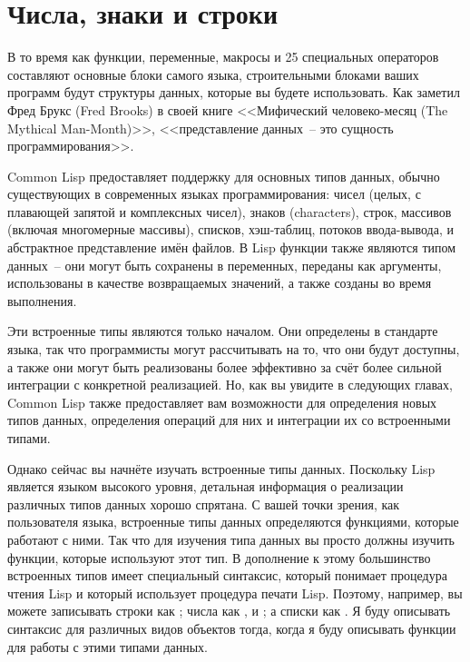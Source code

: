 \chapter{Числа, знаки и строки}
\label{ch:10}

В то время как функции, переменные, макросы и 25 специальных операторов составляют
основные блоки самого языка, строительными блоками ваших программ будут структуры данных,
которые вы будете использовать.  Как заметил Фред Брукс (Fred Brooks) в своей книге
<<Мифический человеко-месяц (The Mythical Man-Month)>>, <<представление данных~-- это
сущность программирования>>.

Common Lisp предоставляет поддержку для основных типов данных, обычно существующих в
современных языках программирования: чисел (целых, с плавающей запятой и комплексных
чисел), знаков (characters), строк, массивов
(включая многомерные массивы), списков, хэш-таблиц, потоков ввода-вывода, и абстрактное
представление имён файлов.  В Lisp функции также являются типом данных~-- они могут быть
сохранены в переменных, переданы как аргументы, использованы в качестве возвращаемых
значений, а также созданы во время выполнения.

Эти встроенные типы являются только началом.  Они определены в стандарте языка, так что
программисты могут рассчитывать на то, что они будут доступны, а также они могут быть
реализованы более эффективно за счёт более сильной интеграции с конкретной реализацией.
Но, как вы увидите в следующих главах, Common Lisp также предоставляет вам возможности для
определения новых типов данных, определения операций для них и интеграции их со
встроенными типами.

Однако сейчас вы начнёте изучать встроенные типы данных.  Поскольку Lisp является языком
высокого уровня, детальная информация о реализации различных типов данных хорошо спрятана.
С вашей точки зрения, как пользователя языка, встроенные типы данных определяются
функциями, которые работают с ними.  Так что для изучения типа данных вы просто должны
изучить функции, которые используют этот тип.  В дополнение к этому большинство
встроенных типов имеет специальный синтаксис, который понимает процедура чтения Lisp и
который использует процедура печати Lisp.  Поэтому, например, вы можете записывать строки
как ; числа как ,  и ; а списки как .  Я буду описывать синтаксис для различных видов объектов тогда, когда я буду
описывать функции для работы с этими типами данных.

